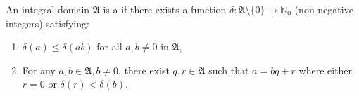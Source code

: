 An integral domain $\mathfrak{A}$ is a  if there exists a function $\delta : \mathfrak{A} \setminus \{0\} \to \mathbb{N}_0$ (non-negative integers) satisfying:
\begin{enumerate}
\item $\delta(a) \leq \delta(ab)$ for all $a, b \neq 0$ in $\mathfrak{A}$,
\item For any $a, b \in \mathfrak{A}, b \neq 0$, there exist $q, r \in \mathfrak{A}$ such that $a = bq + r$ where either $r = 0$ or $\delta(r) < \delta(b)$.
\end{enumerate}
